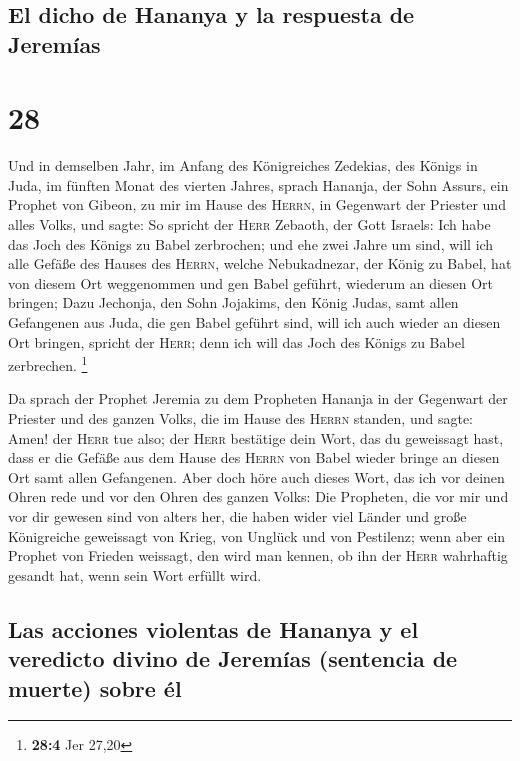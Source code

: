 \hypertarget{el-dicho-de-hananya-y-la-respuesta-de-jeremuxedas}{%
\subsection{El dicho de Hananya y la respuesta de
Jeremías}\label{el-dicho-de-hananya-y-la-respuesta-de-jeremuxedas}}

\hypertarget{section-27}{%
\section{28}\label{section-27}}

 Und in demselben Jahr, im Anfang des Königreiches
Zedekias, des Königs in Juda, im fünften Monat des vierten Jahres,
sprach Hananja, der Sohn Assurs, ein Prophet von Gibeon, zu mir im Hause
des \textsc{Herrn}, in Gegenwart der Priester und alles Volks, und
sagte:  So spricht der \textsc{Herr} Zebaoth, der Gott
Israels: Ich habe das Joch des Königs zu Babel zerbrochen;
 und ehe zwei Jahre um sind, will ich alle Gefäße des
Hauses des \textsc{Herrn}, welche Nebukadnezar, der König zu Babel, hat
von diesem Ort weggenommen und gen Babel geführt, wiederum an diesen Ort
bringen;  Dazu Jechonja, den Sohn Jojakims, den König
Judas, samt allen Gefangenen aus Juda, die gen Babel geführt sind, will
ich auch wieder an diesen Ort bringen, spricht der \textsc{Herr}; denn
ich will das Joch des Königs zu Babel zerbrechen. \footnote{\textbf{28:4}
  Jer 27,20}

 Da sprach der Prophet Jeremia zu dem Propheten Hananja in
der Gegenwart der Priester und des ganzen Volks, die im Hause des
\textsc{Herrn} standen,  und sagte: Amen! der
\textsc{Herr} tue also; der \textsc{Herr} bestätige dein Wort, das du
geweissagt hast, dass er die Gefäße aus dem Hause des \textsc{Herrn} von
Babel wieder bringe an diesen Ort samt allen Gefangenen. 
Aber doch höre auch dieses Wort, das ich vor deinen Ohren rede und vor
den Ohren des ganzen Volks:  Die Propheten, die vor mir
und vor dir gewesen sind von alters her, die haben wider viel Länder und
große Königreiche geweissagt von Krieg, von Unglück und von Pestilenz;
 wenn aber ein Prophet von Frieden weissagt, den wird man
kennen, ob ihn der \textsc{Herr} wahrhaftig gesandt hat, wenn sein Wort
erfüllt wird.

\hypertarget{las-acciones-violentas-de-hananya-y-el-veredicto-divino-de-jeremuxedas-sentencia-de-muerte-sobre-uxe9l}{%
\subsection{Las acciones violentas de Hananya y el veredicto divino de
Jeremías (sentencia de muerte) sobre
él}\label{las-acciones-violentas-de-hananya-y-el-veredicto-divino-de-jeremuxedas-sentencia-de-muerte-sobre-uxe9l}}

